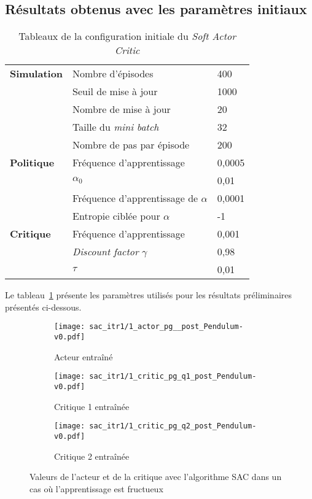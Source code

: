 \subsection{Résultats obtenus avec les paramètres initiaux}

\begin{table}[H]
        \centering
        \begin{tabular}{@{}l l l@{}}
            \toprule
            \textbf{Simulation} & Nombre d'épisodes & 400 \\
            & Seuil de mise à jour & 1000 \\
            & Nombre de mise à jour & 20 \\
            & Taille du \emph{mini batch} & 32 \\
            & Nombre de pas par épisode & 200 \\ \midrule
            \textbf{Politique} & Fréquence d'apprentissage & 0,0005\\
            & \(\alpha_{0}\) & 0,01\\
            & Fréquence d'apprentissage de \(\alpha\) & 0,0001\\
            & Entropie ciblée pour \(\alpha\) & -1\\ \midrule
            \textbf{Critique} & Fréquence d'apprentissage & 0,001\\
            & \emph{Discount factor} \(\gamma\) & 0,98\\
            & \(\tau\) & 0,01\\
            \bottomrule
        \end{tabular}
    \caption{Tableaux de la configuration initiale du \emph{Soft Actor Critic}}\label{tab:sac:initial_settings}
\end{table}

Le tableau~\ref{tab:sac:initial_settings} présente les paramètres utilisés pour
les résultats préliminaires présentés ci-dessous.

\begin{figure}[H]
    \centering
    \begin{subfigure}{0.3\textwidth}
        \texttt{[image: sac\_itr1/1\_actor\_pg\_\_post\_Pendulum-v0.pdf]}
        \caption{Acteur entraîné}
    \end{subfigure}
    \begin{subfigure}{0.3\textwidth}
        \texttt{[image: sac\_itr1/1\_critic\_pg\_q1\_post\_Pendulum-v0.pdf]}
        \caption{Critique 1 entraînée}
    \end{subfigure}
    \begin{subfigure}{0.3\textwidth}
        \texttt{[image: sac\_itr1/1\_critic\_pg\_q2\_post\_Pendulum-v0.pdf]}
        \caption{Critique 2 entraînée}
    \end{subfigure}
    \caption{Valeurs de l'acteur et de la critique avec l'algorithme SAC dans un cas où l'apprentissage est fructueux}\label{fig:sac:preli_success}
\end{figure}

